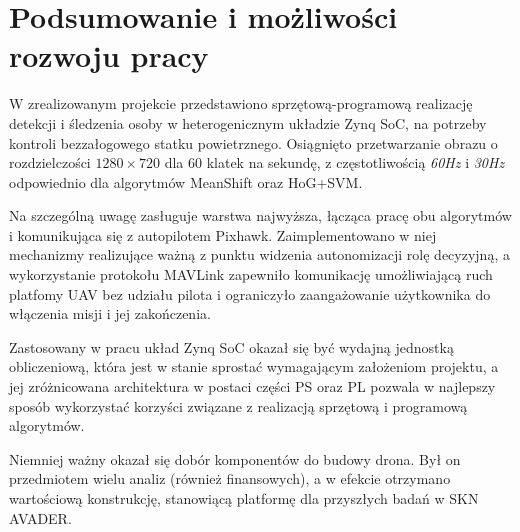 \chapter{Podsumowanie i możliwości rozwoju pracy}

W zrealizowanym projekcie przedstawiono sprzętową-programową realizację detekcji i śledzenia osoby w heterogenicznym układzie Zynq SoC, na potrzeby kontroli bezzałogowego statku powietrznego. 
Osiągnięto przetwarzanie obrazu o rozdzielczości $1280\times 720$ dla 60 klatek na sekundę, z częstotliwością \textit{60Hz} i \textit{30Hz} odpowiednio dla algorytmów MeanShift oraz HoG+SVM.

Na szczególną uwagę zasługuje warstwa najwyższa, łącząca pracę obu algorytmów i komunikująca się z autopilotem Pixhawk. Zaimplementowano w niej mechanizmy realizujące ważną z punktu widzenia autonomizacji rolę decyzyjną, a wykorzystanie protokołu MAVLink zapewniło komunikację umożliwiającą ruch platfomy UAV bez udziału pilota i ograniczyło zaangażowanie użytkownika do włączenia misji i jej zakończenia.

Zastosowany w pracu układ Zynq SoC okazał się być wydajną jednostką obliczeniową, która jest w stanie sprostać wymagającym założeniom projektu, a jej zróżnicowana architektura w postaci części PS oraz PL pozwala w najlepszy sposób wykorzystać korzyści związane z realizacją sprzętową i programową algorytmów.

Niemniej ważny okazał się dobór komponentów do budowy drona. Był on przedmiotem wielu analiz (również finansowych), a w efekcie otrzymano wartościową konstrukcję, stanowiącą platformę dla przyszłych badań w SKN AVADER.




